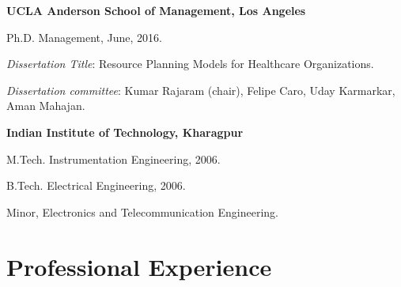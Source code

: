 \documentclass[11pt,a4paper]{article}
\renewenvironment{itemize}{
	\begin{list}{}{
			\setlength{\leftmargin}{1.5em}
		}
	}{
\end{list}
}
\begin{document}
	\begin{itemize}
		\item \textbf{UCLA Anderson School of Management, Los Angeles}
		\begin{itemize}
			\item Ph.D. Management,  June, 2016.
			\item \emph{Dissertation Title}: Resource Planning Models for Healthcare Organizations.
			\item \emph{Dissertation committee}: Kumar Rajaram (chair), Felipe Caro, Uday Karmarkar, {Aman Mahajan}.
		\end{itemize}
		\item \textbf{Indian Institute of Technology, Kharagpur}
		\begin{itemize}
			\item M.Tech. Instrumentation Engineering, 2006.
			\item B.Tech. Electrical Engineering, 2006.
			\item Minor, Electronics and Telecommunication Engineering.
		\end{itemize}




	\end{itemize}


	\section*{\textbf{Professional Experience}}
\end{document}

